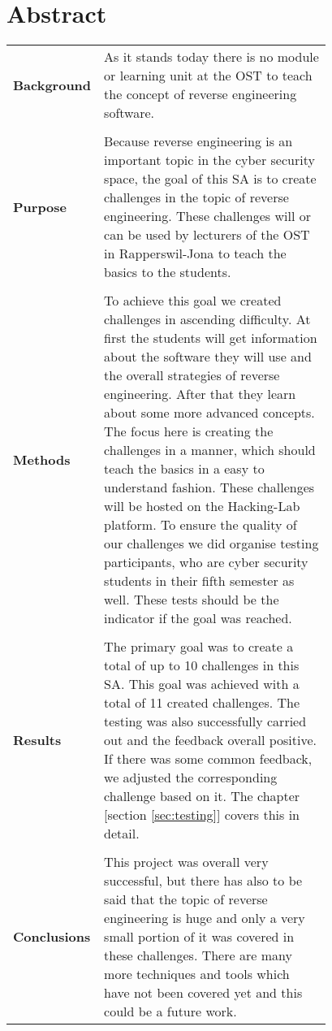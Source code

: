 \chapter{Abstract}
\begin{table}[H]
    \begin{tabular}{lp{0.78\linewidth}}
    \textbf{Background} & As it stands today there is no module or learning unit at the OST to teach the concept of reverse engineering software. \\
    \\
    \textbf{Purpose}    & Because reverse engineering is an important topic in the cyber security space, the goal of this SA is to create challenges in the topic of reverse engineering. These challenges will or can be used by lecturers of the OST in Rapperswil-Jona to teach the basics to the students. \\
    \\
    \textbf{Methods}    & To achieve this goal we created challenges in ascending difficulty. At first the students will get information about the software they will use and the overall strategies of reverse engineering. After that they learn about some more advanced concepts. The focus here is creating the challenges in a manner, which should teach the basics in a easy to understand fashion. These challenges will be hosted on the Hacking-Lab platform. To ensure the quality of our challenges we did organise testing participants, who are cyber security students in their fifth semester as well. These tests should be the indicator if the goal was reached. \\
    \\
    \textbf{Results}    & The primary goal was to create a total of up to 10 challenges in this SA. This goal was achieved with a total of 11 created challenges. The testing was also successfully carried out and the feedback overall positive. If there was some common feedback, we adjusted the corresponding challenge based on it. The chapter [section \ref{sec:testing}] covers this in detail. \\
    \\
    \textbf{Conclusions} & This project was overall very successful, but there has also to be said that the topic of reverse engineering is huge and only a very small portion of it was covered in these challenges. There are many more techniques and tools which have not been covered yet and this could be a future work. 
    \end{tabular}
    \end{table}
